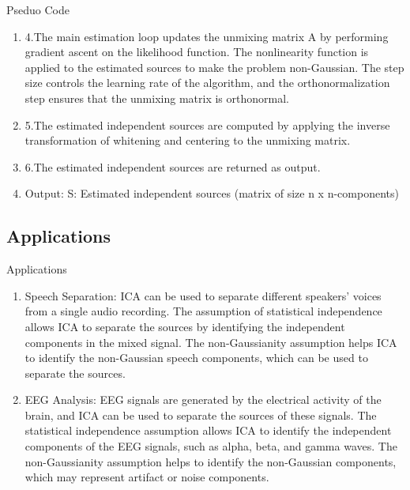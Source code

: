 \documentclass{beamer}
\begin{document}
\begin{frame}{Pseduo Code}
    \begin{enumerate}
        \item 4.The main estimation loop updates the unmixing matrix A by performing gradient ascent on the likelihood function. The nonlinearity function is applied to the estimated sources to make the problem non-Gaussian. The step size controls the learning rate of the algorithm, and the orthonormalization step ensures that the unmixing matrix is orthonormal.
        \item 5.The estimated independent sources are computed by applying the inverse transformation of whitening and centering to the unmixing matrix.
        \item 6.The estimated independent sources are returned as output.
        \item Output: \newline
        S: Estimated independent sources (matrix of size n x n-components)
    \end{enumerate}
\end{frame}

\subsection{Applications}
\begin{frame}{Applications}
    \begin{enumerate}
        \item Speech Separation: ICA can be used to separate different speakers' voices from a single audio recording. The assumption of statistical independence allows ICA to separate the sources by identifying the independent components in the mixed signal. The non-Gaussianity assumption helps ICA to identify the non-Gaussian speech components, which can be used to separate the sources.
        \item EEG Analysis: EEG signals are generated by the electrical activity of the brain, and ICA can be used to separate the sources of these signals. The statistical independence assumption allows ICA to identify the independent components of the EEG signals, such as alpha, beta, and gamma waves. The non-Gaussianity assumption helps to identify the non-Gaussian components, which may represent artifact or noise components.
    \end{enumerate}
\end{frame}
\end{document}

